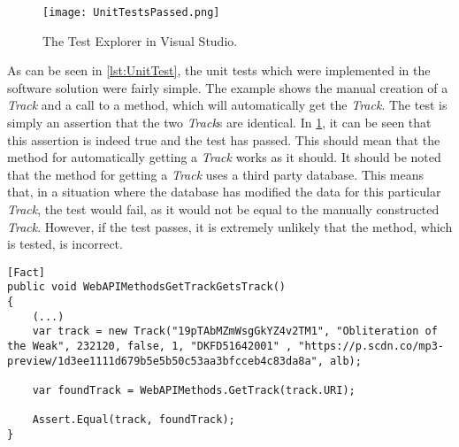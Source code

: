 \begin{figure}[H]
  \centering
  \texttt{[image: UnitTestsPassed.png]}
  \caption{The Test Explorer in Visual Studio.}\label{fig:UnitTestsPassed}
\end{figure}

As can be seen in \cref{lst:UnitTest}, the unit tests which were implemented in the software solution were fairly simple. The example shows the manual creation of a \emph{Track} and a call to a method, which will automatically get the \emph{Track}. The test is simply an assertion that the two \emph{Track}s are identical. In \cref{fig:UnitTestsPassed}, it can be seen that this assertion is indeed true and the test has passed. This should mean that the method for automatically getting a \emph{Track} works as it should.
It should be noted that the method for getting a \emph{Track} uses a third party database. This means that, in a situation where the database has modified the data for this particular \emph{Track}, the test would fail, as it would not be equal to the manually constructed \emph{Track}. However, if the test passes, it is extremely unlikely that the method, which is tested, is incorrect.

\begin{lstlisting}[float, floatplacement=htpb,caption = {Test method for the automatic getting of a \textbf{Track}}, label = {lst:UnitTest}]
[Fact]
public void WebAPIMethodsGetTrackGetsTrack()
{
	(...)
	var track = new Track("19pTAbMZmWsgGkYZ4v2TM1", "Obliteration of the Weak", 232120, false, 1, "DKFD51642001" , "https://p.scdn.co/mp3-preview/1d3ee1111d679b5e5b50c53aa3bfcceb4c83da8a", alb);

	var foundTrack = WebAPIMethods.GetTrack(track.URI);

	Assert.Equal(track, foundTrack);
}
\end{lstlisting}
